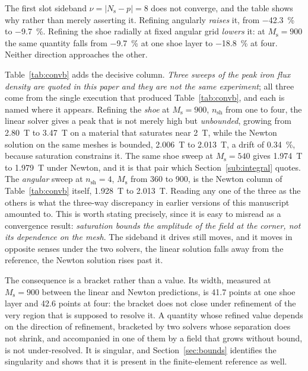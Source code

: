 \documentclass[10pt,a4paper,twocolumn]{article}
\theoremstyle{plain}
\theoremstyle{remark}
\begin{document}
The first slot sideband $\nu=|N_{\mathrm{s}}-p|=8$ does not converge,
and the table shows why rather than merely asserting it. Refining
angularly \emph{raises} it, from \SI{-42.3}{\percent} to
\SI{-9.7}{\percent}. Refining the shoe radially at fixed angular grid
\emph{lowers} it: at $M_{\mathrm{s}}=900$ the same quantity falls from
\SI{-9.7}{\percent} at one shoe layer to \SI{-18.8}{\percent} at four.
Neither direction approaches the other.

Table~\ref{tab:convb} adds the decisive column. \emph{Three sweeps of
the peak iron flux density are quoted in this paper and they are not the
same experiment}; all three come from the single execution that produced
Table~\ref{tab:convb}, and each is named where it appears. Refining the
\emph{shoe} at $M_{\mathrm{s}}=900$, $n_{\mathrm{sh}}$ from one to
four, the linear solver gives a peak that is not merely high but
\emph{unbounded}, growing from \SI{2.80}{\tesla} to \SI{3.47}{\tesla} on
a material that saturates near \SI{2}{\tesla}, while the Newton solution
on the same meshes is bounded, \SI{2.006}{\tesla} to \SI{2.013}{\tesla},
a drift of \SI{0.34}{\percent}, because saturation constrains it. The
same shoe sweep at $M_{\mathrm{s}}=540$ gives \SI{1.974}{\tesla} to
\SI{1.979}{\tesla} under Newton, and it is that pair which
Section~\ref{sub:integral} quotes. The \emph{angular} sweep at
$n_{\mathrm{sh}}=4$, $M_{\mathrm{s}}$ from 360 to 900, is the Newton
column of Table~\ref{tab:convb} itself, \SI{1.928}{\tesla} to
\SI{2.013}{\tesla}. Reading any one of the three as the others is what
the three-way discrepancy in earlier versions of this manuscript
amounted to. This is worth stating precisely, since it is easy to
misread as a convergence result: \emph{saturation bounds the amplitude
of the field at the corner, not its dependence on the mesh}. The
sideband it drives still moves, and it moves in opposite senses under
the two solvers, the linear solution falls away from the reference, the
Newton solution rises past it.

The consequence is a bracket rather than a value. Its width, measured at
$M_{\mathrm{s}}=900$ between the linear and Newton predictions, is
\num{41.7} points at one shoe layer and \num{42.6} points at four: the
bracket does not close under refinement of the very region that is
supposed to resolve it. A quantity whose refined value depends on the
direction of refinement, bracketed by two solvers whose separation does
not shrink, and accompanied in one of them by a field that grows without
bound, is not under-resolved. It is singular, and
Section~\ref{sec:bounds} identifies the singularity and shows that it is
present in the finite-element reference as well.
\end{document}
